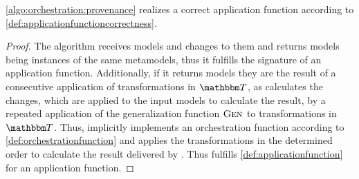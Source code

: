 \begin{theorem} \label{theorem:provenance_correctness}
    \autoref{algo:orchestration:provenance} realizes a correct application function according to \autoref{def:applicationfunctioncorrectness}.
\end{theorem}
\begin{proof}
    The algorithm receives models and changes to them and returns models being instances of the same metamodels, thus it fulfills the signature of an application function.
    Additionally, if it returns models they are the result of a consecutive application of transformations in $\transformationset{T}$, as  calculates the changes, which are applied to the input models to calculate the result, by a repeated application of the generalization function $\textsc{Gen}_{}$ to transformations in $\transformationset{T}$.
    Thus,  implicitly implements an orchestration function according to \autoref{def:orchestrationfunction} and applies the transformations in the determined order to calculate the result delivered by .
    Thus  fulfills \autoref{def:applicationfunction} for an application function.


\end{proof}
